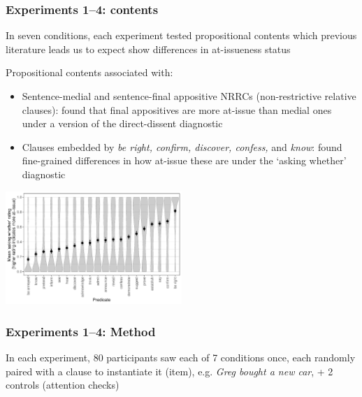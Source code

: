\documentclass[compress, xcolor = dvipsnames, aspectratio=169]{beamer}
\begin{document}
	\begin{frame}[t]\frametitle{Experiments 1–4: contents}\scriptsize
		In seven conditions, each experiment tested propositional contents which previous literature leads us to expect show differences in at-issueness status\medskip\\ \pause

		Propositional contents associated with:\smallskip
		\begin{itemize}
			\item Sentence-medial and sentence-final appositive NRRCs (non-restrictive relative clauses): \citet{syrett_experimental_2015} found that final appositives are more at-issue than medial ones under a version of the direct-dissent diagnostic\smallskip\pause

			\item Clauses embedded by \emph{be right, confirm, discover, confess,} and \emph{know}:
			\citet{degen-tonhauser-glossa} found fine-grained differences in how at-issue these are under the `asking whether' diagnostic\smallskip\pause
		\end{itemize}

		\begin{center}
			\includegraphics[width=0.5\textwidth]{../../results/degen-tonhauser-glossa/graphs/mean-asking-whether-ratings.pdf}
		\end{center}
		
	\end{frame}

	\begin{frame}\frametitle{Experiments 1–4: Method}
		In each experiment, 80 participants saw each of 7 conditions once, each randomly paired with a clause to instantiate it (item), e.g. \emph{Greg bought a new car}, + 2 controls (attention checks)
	
	
	\end{frame}
\end{document}
